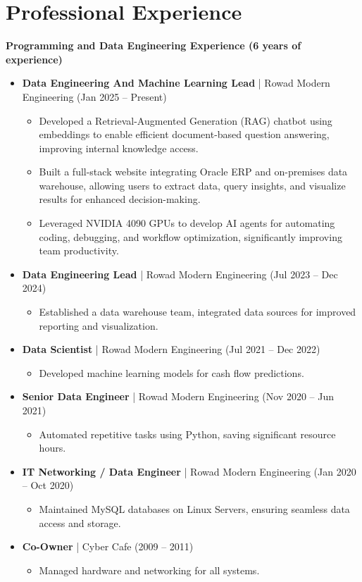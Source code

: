 \documentclass[10pt, letterpaper]{article}
\begin{document}
\section{Professional Experience}
\textbf{\textcolor{primaryColor}{Programming and Data Engineering Experience (6 years of experience)}}
\begin{itemize}[leftmargin=*]
    \item \textbf{Data Engineering And Machine Learning Lead} | Rowad Modern Engineering (Jan 2025 – Present)
    \begin{itemize}[leftmargin=1cm]
        \item Developed a Retrieval-Augmented Generation (RAG) chatbot using embeddings to enable efficient document-based question answering, improving internal knowledge access.
        \item Built a full-stack website integrating Oracle ERP and on-premises data warehouse, allowing users to extract data, query insights, and visualize results for enhanced decision-making.
        \item Leveraged NVIDIA 4090 GPUs to develop AI agents for automating coding, debugging, and workflow optimization, significantly improving team productivity.
    \end{itemize}
    \item \textbf{Data Engineering Lead} | Rowad Modern Engineering (Jul 2023 – Dec 2024)
    \begin{itemize}[leftmargin=1cm]
        \item Established a data warehouse team, integrated data sources for improved reporting and visualization.
    \end{itemize}
    \item \textbf{Data Scientist} | Rowad Modern Engineering (Jul 2021 – Dec 2022)
    \begin{itemize}[leftmargin=1cm]
        \item Developed machine learning models for cash flow predictions.
    \end{itemize}
    \item \textbf{Senior Data Engineer} | Rowad Modern Engineering (Nov 2020 – Jun 2021)
    \begin{itemize}[leftmargin=1cm]
        \item Automated repetitive tasks using Python, saving significant resource hours.
    \end{itemize}
    \item \textbf{IT Networking / Data Engineer} | Rowad Modern Engineering (Jan 2020 – Oct 2020)
    \begin{itemize}[leftmargin=1cm]
        \item Maintained MySQL databases on Linux Servers, ensuring seamless data access and storage.
    \end{itemize}
    \item \textbf{Co-Owner} | Cyber Cafe (2009 – 2011)
    \begin{itemize}[leftmargin=1cm]
        \item Managed hardware and networking for all systems.
    \end{itemize}
\end{itemize}
\end{document}
